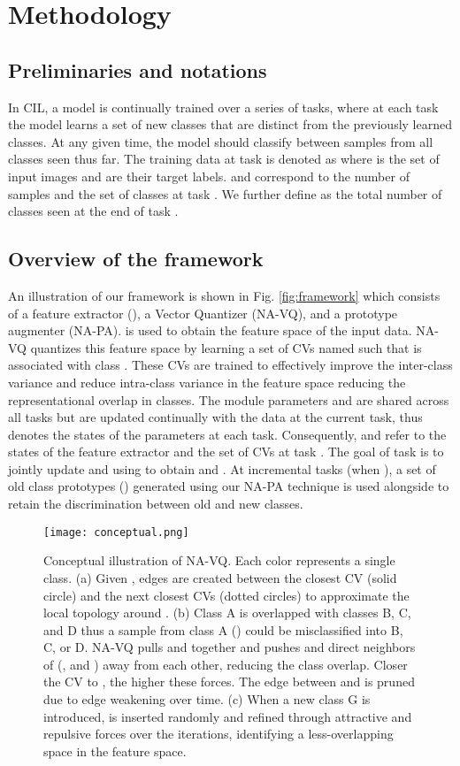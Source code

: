 \documentclass[10pt,twocolumn,letterpaper]{article}
\begin{document}
\section{Methodology}


\subsection{Preliminaries and notations}
In CIL, a model is continually trained over a series of tasks, where at each task the model learns a set of new classes that are distinct from the previously learned classes. At any given time, the model should classify between samples from all classes seen thus far. The training data at task  is denoted as  
where  is the set of input images and   are their target labels.  and  correspond to the number of samples and the set of classes at task . We further define  as the total number of classes seen at the end of task .

\subsection{Overview of the framework}

An illustration of our framework is shown in Fig. \ref{fig:framework} which consists of a feature extractor (), a Vector Quantizer (NA-VQ), and a prototype augmenter (NA-PA).  is used to obtain the feature space of the input data. NA-VQ quantizes this feature space by learning a set of CVs named  such that  is associated with class . These CVs are trained to effectively improve the inter-class variance and reduce intra-class variance in the feature space reducing the representational overlap in classes.
The module parameters  and  are shared across all tasks but are updated continually with the data at the current task, thus  denotes the states of the parameters at each task.
Consequently,  and  refer to the states of the feature extractor and the set of CVs at task .
The goal of task  is to jointly update  and  using  to obtain  and . At incremental tasks (when ), a set of old class prototypes () generated using our NA-PA technique is used alongside  to retain the discrimination between old and new classes.

\begin{figure}[t]
\centering
\texttt{[image: 
conceptual.png]}
\caption{Conceptual illustration of NA-VQ. 
Each color represents a single class. 
(a) Given , edges are created between the closest CV (solid circle) and the next  closest CVs (dotted circles) to approximate the local topology around . (b) Class A is overlapped with classes B, C, and D thus a sample from class A () could be misclassified into B, C, or D. NA-VQ pulls  and  together and pushes  and direct neighbors of  (, and ) away from each other, reducing the class overlap. Closer the CV to , the higher these forces. 
The edge between  and  is pruned due to edge weakening over time. (c) When a new class G is introduced,  is inserted randomly and refined through attractive and repulsive forces over the iterations, identifying a less-overlapping space in the feature space.}
 \label{fig:concept}
\end{figure}
\end{document}
